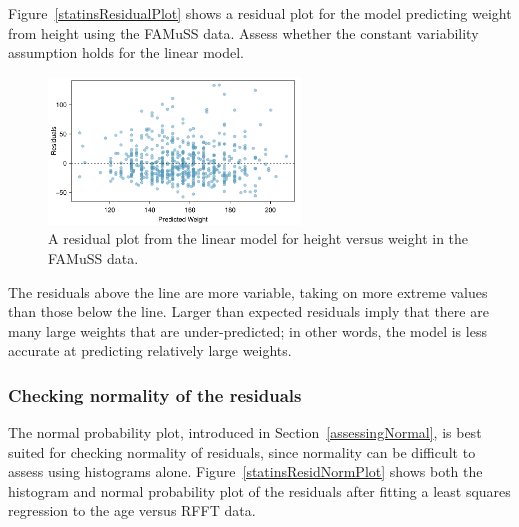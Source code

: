 \begin{example}{
Figure~\ref{statinsResidualPlot} shows a residual plot for the model predicting weight from height using the FAMuSS data. Assess whether the constant variability assumption holds for the linear model.
\begin{figure}[h!]
	\centering
	\includegraphics[width=0.6\textwidth]
	{ch_simple_linear_regression_oi_biostat/figures/famussHeightWeightResidualPlot/famussHeightWeightResidualPlot.pdf}
	\caption{A residual plot from the linear model for height versus weight in the FAMuSS data.}
	\label{famussHeightWeightResidualPlot}
	\end{figure}
}

The residuals above the line are more variable, taking on more extreme values than those below the line. Larger than expected residuals imply that there are many large weights that are under-predicted; in other words, the model is less accurate at predicting relatively large weights.
	
\end{example}



\subsubsection{Checking normality of the residuals}



The normal probability plot, introduced in Section~\ref{assessingNormal}, is best suited for checking normality of residuals, since normality can be difficult to assess using histograms alone. Figure~\ref{statinsResidNormPlot} shows both the histogram and normal probability plot of the residuals after fitting a least squares regression to the age versus RFFT data.  
 
